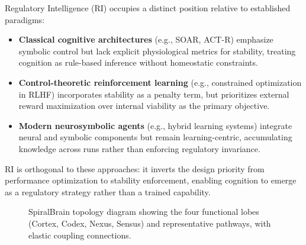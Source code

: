 \documentclass[12pt,a4paper]{report}
\begin{document}
Regulatory Intelligence (RI) occupies a distinct position relative to established paradigms:

\begin{itemize}
\item \textbf{Classical cognitive architectures} (e.g., SOAR, ACT-R) emphasize symbolic control but lack explicit physiological metrics for stability, treating cognition as rule-based inference without homeostatic constraints.

\item \textbf{Control-theoretic reinforcement learning} (e.g., constrained optimization in RLHF) incorporates stability as a penalty term, but prioritizes external reward maximization over internal viability as the primary objective.

\item \textbf{Modern neurosymbolic agents} (e.g., hybrid learning systems) integrate neural and symbolic components but remain learning-centric, accumulating knowledge across runs rather than enforcing regulatory invariance.
\end{itemize}

RI is orthogonal to these approaches: it inverts the design priority from performance optimization to stability enforcement, enabling cognition to emerge as a regulatory strategy rather than a trained capability.

\begin{figure}[H]
  \centering
  \caption{SpiralBrain topology diagram showing the four functional lobes (Cortex, Codex, Nexus, Sensus) and representative pathways, with elastic coupling connections.}
  \label{fig:spiralbrain-topology}
\end{figure}
\end{document}
